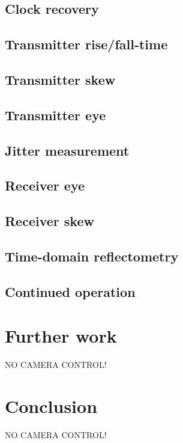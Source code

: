 \documentclass[a4paper,11pt]{report}
\begin{document}
    \section{Clock recovery}
    \section{Transmitter rise/fall-time}
    \section{Transmitter skew}
    \section{Transmitter eye}
    \section{Jitter measurement}
    \section{Receiver eye}
    \section{Receiver skew}
    \section{Time-domain reflectometry}
    \section{Continued operation}

  \chapter{Further work}

  NO CAMERA CONTROL!
  
  \chapter{Conclusion}

  NO CAMERA CONTROL!

  
  \printglossary[type=\acronymtype]
\end{document}
